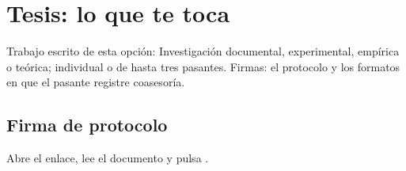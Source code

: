 \section{Tesis: lo que te toca}
Trabajo escrito de esta opción: Investigación documental, experimental, empírica o teórica; individual o de hasta tres pasantes. Firmas: el protocolo y los formatos en que el pasante registre coasesoría.
\subsection{Firma de protocolo}
Abre el enlace, lee el documento y pulsa .
